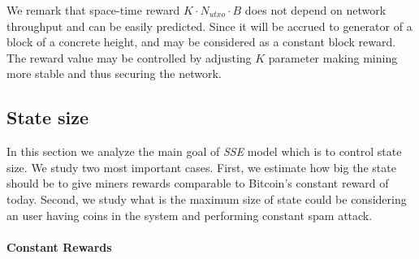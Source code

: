 \documentclass[]{llncs}   %
\newcommand{\authnote}[2]{\marginpar{\parbox{\marginparwidth}{\tiny %
  \textsf{#1 {\textcolor{blue}{notes: #2}}}}}%
  \textcolor{blue}{\textbf{\dag}}}
\newcommand{\authnote}[2]{
  \textsf{#1 \textcolor{blue}{: #2}}}
\newcommand{\authnote}[2]{}
\newcommand{\dnote}[1]{{\authnote{\textcolor{blue}{Dima notes}}{#1}}}
\newcommand{\esse}{\textit{SSE}}
\newcommand{\ignore}[1]{} %
\begin{document}
\ignore{
  \begin{equation}
  \label{eq:reward}
    M_{reward} \approx M_{pg} + (K \cdot B) \cdot ((1 + r_{flow}) \cdot N_{utxo} + r_{mode} \cdot N_{lost})
  \end{equation}

  First part of this equation $M_{pg}$ is the reward of miner in existing fee models, the rest is the unique reward for \esse{} model.  In a sensible assumption $N_{utxo} >> N_{lost}$ equation \ref{eq:reward} can be simplified to

  \begin{equation}
    M_{postpaid} \approx M_{pg} + K \cdot B \cdot N_{utxo} \cdot (1 + M)
  \end{equation}

  that allows to estimate such $K$, when additional \esse{} reward will exceed common propagation reward $M_{pg}$:

  \begin{equation}
    K = {M_{pg} \over B \cdot N_{utxo} \cdot (1 + M)} \approx 10^{-9} ({BTC / (Byte \cdot Block)})
  \end{equation}

  that is naturally coincide to estimations from section \ref{eq:ltmean} while miner reward equals to user losses.
}

We remark that space-time reward $K \cdot N_{utxo} \cdot B$ does not depend on network throughput and can be easily predicted. Since it will be accrued to generator of a block of a concrete height, and may be considered as a constant block reward. The reward value may be controlled by adjusting $K$ parameter making mining more stable and thus securing the network.

\dnote{What is an output value when miner is interested in collecting it?}

\subsection{State size}

In this section we analyze the main goal of \esse{} model which is to control state size. We study two most important cases. First, we estimate how big the state should be to give miners rewards comparable to Bitcoin's constant reward of today. Second, we study what is the maximum size of state could be considering an user having coins in the system and performing constant spam attack.


\paragraph{Constant Rewards}
\end{document}
